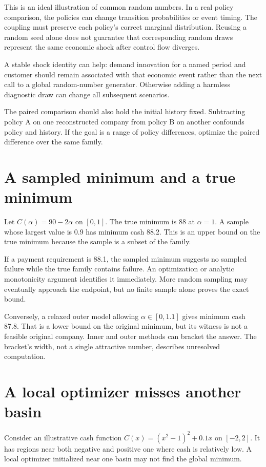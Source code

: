 This is an ideal illustration of common random numbers. In a real policy comparison, the policies can change transition probabilities or event timing. The coupling must preserve each policy's correct marginal distribution. Reusing a random seed alone does not guarantee that corresponding random draws represent the same economic shock after control flow diverges.

A stable shock identity can help: demand innovation for a named period and customer should remain associated with that economic event rather than the next call to a global random-number generator. Otherwise adding a harmless diagnostic draw can change all subsequent scenarios.

The paired comparison should also hold the initial history fixed. Subtracting policy A on one reconstructed company from policy B on another confounds policy and history. If the goal is a range of policy differences, optimize the paired difference over the same family.

\section{A sampled minimum and a true minimum}
Let $C(\alpha)=90-2\alpha$ on $[0,1]$. The true minimum is 88 at $\alpha=1$. A sample whose largest value is 0.9 has minimum cash 88.2. This is an upper bound on the true minimum because the sample is a subset of the family.

If a payment requirement is 88.1, the sampled minimum suggests no sampled failure while the true family contains failure. An optimization or analytic monotonicity argument identifies it immediately. More random sampling may eventually approach the endpoint, but no finite sample alone proves the exact bound.

Conversely, a relaxed outer model allowing $\alpha\in[0,1.1]$ gives minimum cash 87.8. That is a lower bound on the original minimum, but its witness is not a feasible original company. Inner and outer methods can bracket the answer. The bracket's width, not a single attractive number, describes unresolved computation.

\section{A local optimizer misses another basin}
Consider an illustrative cash function $C(x)=(x^2-1)^2+0.1x$ on $[-2,2]$. It has regions near both negative and positive one where cash is relatively low. A local optimizer initialized near one basin may not find the global minimum.


